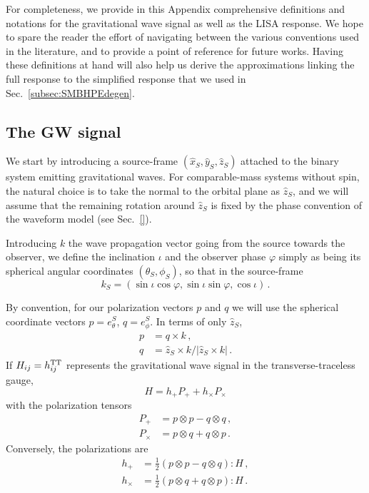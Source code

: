 \documentclass[aps,showpacs,twocolumn,prd,superscriptaddress,nofootinbib]{revtex4-1}
\newcommand{\be}{\begin{equation}}
\newcommand{\ee}{\end{equation}}
\newcommand{\bsub}{\begin{subequations}}
\newcommand{\esub}{\end{subequations}}
\begin{document}
For completeness, we provide in this Appendix comprehensive definitions and notations for the gravitational wave signal as well as the LISA response. We hope to spare the reader the effort of navigating between the various conventions used in the literature, and to provide a point of reference for future works. Having these definitions at hand will also help us derive the approximations linking the full response to the simplified response that we used in Sec.~\ref{subsec:SMBHPEdegen}.


\subsection{The GW signal}
\label{sec:gwsignal}

We start by introducing a source-frame $(\hat{x}_{S}, \hat{y}_{S}, \hat{z}_{S})$ attached to the binary system emitting gravitational waves. For comparable-mass systems without spin, the natural choice is to take the normal to the orbital plane as $\hat{z}_{S}$, and we will assume that the remaining rotation around $\hat{z}_{S}$ is fixed by the phase convention of the waveform model (see Sec.~\ref{}).

Introducing $k$ the wave propagation vector going from the source towards the observer, we define the inclination $\iota$ and the observer phase $\varphi$ simply as being its spherical angular coordinates $(\theta_{S}, \phi_{S})$, so that in the source-frame
\be
	k_{S} = (\sin\iota \cos\varphi, \sin\iota \sin\varphi, \cos\iota) \,.
\ee

By convention, for our polarization vectors $p$ and $q$ we will use the spherical coordinate vectors $p = e_{\theta}^{S}$, $q = e_{\phi}^{S}$. In terms of only $\hat{z}_{S}$,
\bsub
\begin{align}
	p &= q \times k \,,\\
	q &= \hat{z}_{S} \times k / |\hat{z}_{S} \times k|\,.
\end{align}
\esub
If $H_{ij} = h_{ij}^{\rm TT}$ represents the gravitational wave signal in the transverse-traceless gauge,
\be
	H = h_{+} P_{+} + h_{\times} P_{\times}
\ee
with the polarization tensors
\bsub
\begin{align}
	P_{+} &= p \otimes p - q \otimes q \,,\\
	P_{\times} &= p \otimes q + q \otimes p \,.
\end{align}
\esub
Conversely, the polarizations are
\bsub
\begin{align}
	h_{+} &= \frac{1}{2} \left(p \otimes p - q \otimes q \right) : H \,,\\
	h_{\times} &= \frac{1}{2} \left( p \otimes q + q \otimes p \right) : H \,.
\end{align}
\esub
\end{document}
